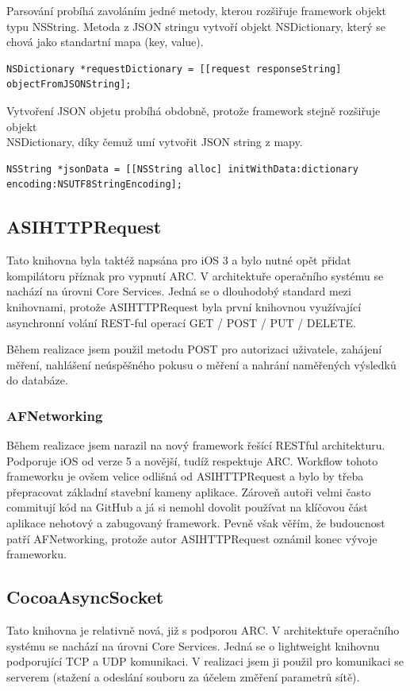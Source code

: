 Parsování probíhá zavoláním jedné metody, kterou rozšiřuje framework objekt typu NSString. Metoda z JSON stringu vytvoří objekt NSDictionary, který se chová jako standartní mapa (key, value).

\begin{lstlisting}
NSDictionary *requestDictionary = [[request responseString] objectFromJSONString];
\end{lstlisting}

Vytvoření JSON objetu probíhá obdobně, protože framework stejně rozšiřuje objekt \\NSDictionary, díky čemuž umí vytvořit JSON string z mapy.

\begin{lstlisting}
NSString *jsonData = [[NSString alloc] initWithData:dictionary encoding:NSUTF8StringEncoding];
\end{lstlisting}

\subsection{ASIHTTPRequest}
Tato knihovna byla taktéž napsána pro iOS 3 a bylo nutné opět přidat kompilátoru příznak pro vypnutí ARC. V architektuře operačního systému se nachází na úrovni Core Services. Jedná se o dlouhodobý standard mezi knihovnami, protože ASIHTTPRequest byla první knihovnou využívající asynchronní volání REST-ful operací GET / POST / PUT / DELETE.

Během realizace jsem použil metodu POST pro autorizaci uživatele, zahájení měření, nahlášení neúspěšného pokusu o měření a nahrání naměřených výsledků do databáze.

\subsubsection*{AFNetworking}
Během realizace jsem narazil na nový framework řešící RESTful architekturu. Podporuje iOS od verze 5 a novější, tudíž respektuje ARC. Workflow tohoto frameworku je ovšem velice odlišná od ASIHTTPRequest a bylo by třeba přepracovat základní stavební kameny aplikace. Zároveň autoři velmi často commitují kód na GitHub a já si nemohl dovolit používat na klíčovou část aplikace nehotový a zabugovaný framework. Pevně však věřím, že budoucnost patří AFNetworking, protože autor ASIHTTPRequest oznámil konec vývoje frameworku.

\subsection{CocoaAsyncSocket}
Tato knihovna je relativně nová, již s podporou ARC. V architektuře operačního systému se nachází na úrovni Core Services. Jedná se o lightweight knihovnu podporující TCP a UDP komunikaci. V realizaci jsem ji použil pro komunikaci se serverem (stažení a odeslání souboru za účelem změření parametrů sítě).

